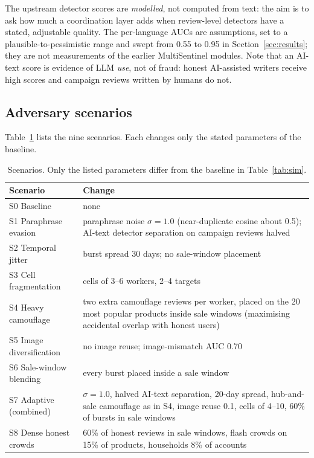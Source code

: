 \documentclass[pdflatex,sn-basic]{sn-jnl}
\theoremstyle{thmstyleone}
\theoremstyle{thmstylethree}
\begin{document}
The upstream detector scores are \emph{modelled}, not computed from text: the aim is to ask how much a coordination layer adds when review-level detectors have a stated, adjustable quality. The per-language AUCs are assumptions, set to a plausible-to-pessimistic range and swept from 0.55 to 0.95 in Section~\ref{sec:results}; they are not measurements of the earlier MultiSentinel modules. Note that an AI-text score is evidence of LLM \emph{use}, not of fraud: honest AI-assisted writers receive high scores and campaign reviews written by humans do not.

\subsection{Adversary scenarios}
Table~\ref{tab:scen_def} lists the nine scenarios. Each changes only the stated parameters of the baseline.

\begin{table}[t]
\caption{Scenarios. Only the listed parameters differ from the baseline in Table~\ref{tab:sim}.}\label{tab:scen_def}
\small
\begin{tabular}{@{}p{3.0cm}p{8.4cm}@{}}
\toprule
Scenario & Change \\
\midrule
S0 Baseline & none \\
S1 Paraphrase evasion & paraphrase noise $\sigma=1.0$ (near-duplicate cosine about 0.5); AI-text detector separation on campaign reviews halved \\
S2 Temporal jitter & burst spread 30 days; no sale-window placement \\
S3 Cell fragmentation & cells of 3--6 workers, 2--4 targets \\
S4 Heavy camouflage & two extra camouflage reviews per worker, placed on the 20 most popular products inside sale windows (maximising accidental overlap with honest users) \\
S5 Image diversification & no image reuse; image-mismatch AUC 0.70 \\
S6 Sale-window blending & every burst placed inside a sale window \\
S7 Adaptive (combined) & $\sigma=1.0$, halved AI-text separation, 20-day spread, hub-and-sale camouflage as in S4, image reuse 0.1, cells of 4--10, 60\% of bursts in sale windows \\
S8 Dense honest crowds & 60\% of honest reviews in sale windows, flash crowds on 15\% of products, households 8\% of accounts \\
\bottomrule
\end{tabular}
\end{table}
\end{document}
